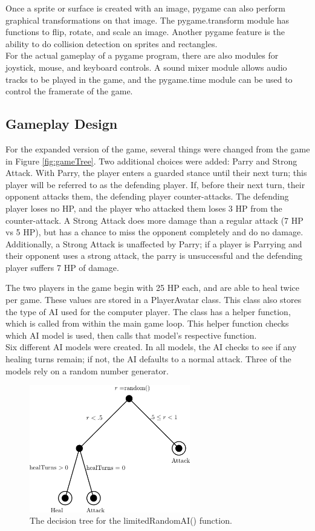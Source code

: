 Once a sprite or surface is created with an image, pygame can also perform graphical transformations on that image. The pygame.transform module has functions to flip, rotate, and scale an image. Another pygame feature is the ability to do collision detection on sprites and rectangles.\\

For the actual gameplay of a pygame program, there are also modules for joystick, mouse, and keyboard controls. A sound mixer module allows audio tracks to be played in the game, and the pygame.time module can be used to control the framerate of the game.

\subsection{Gameplay Design}
For the expanded version of the game, several things were changed from the game in Figure \ref{fig:gameTree}. Two additional choices were added: Parry and Strong Attack. With Parry, the player enters a guarded stance until their next turn; this player will be referred to as the defending player. If, before their next turn, their opponent attacks them, the defending player counter-attacks. The defending player loses no HP, and the player who attacked them loses 3 HP from the counter-attack. A Strong Attack does more damage than a regular attack (7 HP vs 5 HP), but has a chance to miss the opponent completely and do no damage. Additionally, a Strong Attack is unaffected by Parry; if a player is Parrying and their opponent uses a strong attack, the parry is unsuccessful and the defending player suffers 7 HP of damage.

The two players in the game begin with 25 HP each, and are able to heal twice per game. These values are stored in a PlayerAvatar class. This class also stores the type of AI used for the computer player. The class has a helper function, which is called from within the main game loop. This helper function checks which AI model is used, then calls that model's respective function.\\

Six different AI models were created. In all models, the AI checks to see if any healing turns remain; if not, the AI defaults to a normal attack. Three of the models rely on a random number generator.\\

\begin{figure}[H]
  \centering
  \includegraphics[width=7cm]{figures/AILimitedRandom.png}
  \caption{The decision tree for the limitedRandomAI() function.}
  \label{fig:AI1}
\end{figure}

